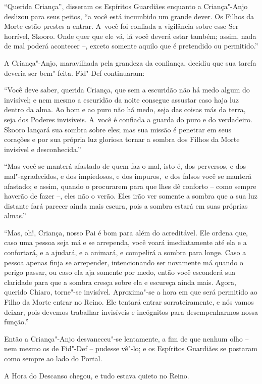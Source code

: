 ``Querida Criança'', disseram os Espíritos Guardiães enquanto a
Criança"-Anjo deslizou para seus peitos, ``a você está incumbido um
grande dever. Os Filhos da Morte estão prestes a entrar. A~você foi
confiada a vigilância sobre esse Ser horrível, Skooro. Onde quer que ele vá,
lá você deverá estar também; assim, nada de mal poderá acontecer --, exceto
somente aquilo que é pretendido ou permitido.''

A Criança"-Anjo, maravilhada pela grandeza da confiança, decidiu que sua
tarefa deveria ser bem"-feita. Fid"-Def continuaram:

``Você deve saber, querida Criança, que sem a escuridão não há medo
algum do invisível; e nem mesmo a escuridão da noite consegue assustar caso
haja luz dentro da alma. Ao bom e ao puro não há medo, seja das coisas más
da terra, seja dos Poderes invisíveis. A~você é confiada a guarda do
puro e do verdadeiro. Skooro lançará sua sombra sobre eles; mas
sua missão é penetrar em seus corações e por sua própria luz gloriosa tornar a
sombra dos Filhos da Morte invisível e desconhecida.''

``Mas você se manterá afastado de quem faz o mal, isto é, dos perversos, e dos mal"-agradecidos, e
dos impiedosos, e dos impuros,~e dos falsos você se manterá afastado; e
assim, quando o procurarem para que lhes dê conforto -- como sempre
haverão de fazer --, eles não o verão. Eles irão ver somente a sombra que a sua
luz distante fará parecer ainda mais escura, pois a sombra estará em
suas próprias almas.''

``Mas, oh!, Criança, nosso Pai é bom para além do acreditável. Ele ordena
que, caso uma pessoa seja má e se arrependa, você voará imediatamente até
ela e a confortará, e a ajudará, e a animará, e compelirá a sombra para
longe. Caso a pessoa apenas finja se arrepender, intencionando ser novamente
má quando o perigo passar, ou caso ela aja somente por medo,
então você esconderá sua claridade para que a sombra cresça sobre ela e
escureça ainda mais. Agora, querido Chiaro, torne"-se invisível.
Aproxima"-se a hora em que será permitido ao Filho da Morte entrar no
Reino. Ele tentará entrar sorrateiramente, e nós vamos deixar, pois
devemos trabalhar invisíveis e incógnitos para desempenharmos nossa
função.''

Então a Criança"-Anjo desvaneceu"-se lentamente, a fim de que nenhum olho
-- nem mesmo os de Fid"-Def -- pudesse vê"-lo; e os Espíritos Guardiães se
postaram como sempre ao lado do Portal.

A Hora do Descanso chegou, e tudo estava quieto no Reino.


